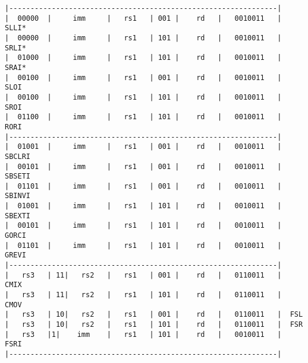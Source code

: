 \begin{minipage}{\linewidth}
\begin{verbatim}
|---------------------------------------------------------------|
|  00000  |     imm     |   rs1   | 001 |    rd   |   0010011   |  SLLI*
|  00000  |     imm     |   rs1   | 101 |    rd   |   0010011   |  SRLI*
|  01000  |     imm     |   rs1   | 101 |    rd   |   0010011   |  SRAI*
|  00100  |     imm     |   rs1   | 001 |    rd   |   0010011   |  SLOI
|  00100  |     imm     |   rs1   | 101 |    rd   |   0010011   |  SROI
|  01100  |     imm     |   rs1   | 101 |    rd   |   0010011   |  RORI
|---------------------------------------------------------------|
|  01001  |     imm     |   rs1   | 001 |    rd   |   0010011   |  SBCLRI
|  00101  |     imm     |   rs1   | 001 |    rd   |   0010011   |  SBSETI
|  01101  |     imm     |   rs1   | 001 |    rd   |   0010011   |  SBINVI
|  01001  |     imm     |   rs1   | 101 |    rd   |   0010011   |  SBEXTI
|  00101  |     imm     |   rs1   | 101 |    rd   |   0010011   |  GORCI
|  01101  |     imm     |   rs1   | 101 |    rd   |   0010011   |  GREVI
|---------------------------------------------------------------|
|   rs3   | 11|   rs2   |   rs1   | 001 |    rd   |   0110011   |  CMIX
|   rs3   | 11|   rs2   |   rs1   | 101 |    rd   |   0110011   |  CMOV
|   rs3   | 10|   rs2   |   rs1   | 001 |    rd   |   0110011   |  FSL
|   rs3   | 10|   rs2   |   rs1   | 101 |    rd   |   0110011   |  FSR
|   rs3   |1|    imm    |   rs1   | 101 |    rd   |   0010011   |  FSRI
|---------------------------------------------------------------|
\end{verbatim}
\end{minipage}

